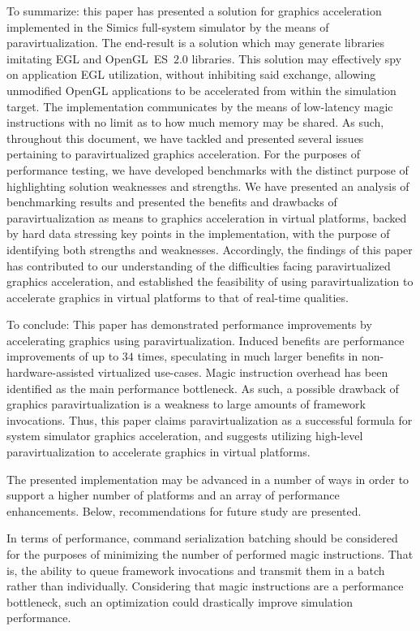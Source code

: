 To summarize: this paper has presented a solution for graphics acceleration implemented in the Simics full-system simulator by the means of paravirtualization.
The end-result is a solution which may generate libraries imitating EGL and OpenGL~ES~$2.0$ libraries.
This solution may effectively spy on application EGL utilization, without inhibiting said exchange, allowing unmodified OpenGL applications to be accelerated from within the simulation target.
The implementation communicates by the means of low-latency magic instructions with no limit as to how much memory may be shared.
As such, throughout this document, we have tackled and presented several issues pertaining to paravirtualized graphics acceleration.
For the purposes of performance testing, we have developed benchmarks with the distinct purpose of highlighting solution weaknesses and strengths.
We have presented an analysis of benchmarking results and presented the benefits and drawbacks of paravirtualization as means to graphics acceleration in virtual platforms, backed by hard data stressing key points in the implementation, with the purpose of identifying both strengths and weaknesses.
Accordingly, the findings of this paper has contributed to our understanding of the difficulties facing paravirtualized graphics acceleration, and established the feasibility of using paravirtualization to accelerate graphics in virtual platforms to that of real-time qualities.

To conclude: This paper has demonstrated performance improvements by accelerating graphics using paravirtualization.
Induced benefits are performance improvements of up to $34$ times, speculating in much larger benefits in non-hardware-assisted virtualized use-cases.
Magic instruction overhead has been identified as the main performance bottleneck.
As such, a possible drawback of graphics paravirtualization is a weakness to large amounts of framework invocations.
Thus, this paper claims paravirtualization as a successful formula for system simulator graphics acceleration, and suggests utilizing high-level paravirtualization to accelerate graphics in virtual platforms.

The presented implementation may be advanced in a number of ways in order to support a higher number of platforms and an array of performance enhancements.
Below, recommendations for future study are presented.

In terms of performance, command serialization batching should be considered for the purposes of minimizing the number of performed magic instructions.
That is, the ability to queue framework invocations and transmit them in a batch rather than individually.
Considering that magic instructions are a performance bottleneck, such an optimization could drastically improve simulation performance.

